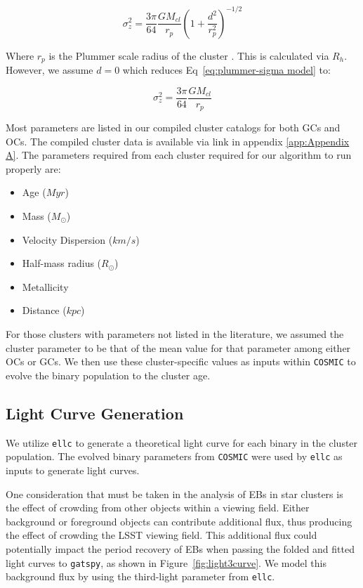\documentclass[twocolumn]{aastex63}
\begin{document}
\begin{equation}
    \sigma_z^2 = \frac{3\pi}{64}\frac{GM_{cl}}{r_p}\left(1 + \frac{d^2}{r_p^2} \right)^{-1/2}
    \label{eq:plummer-sigma model}
\end{equation}

 Where $r_p$ is the Plummer scale radius of the cluster \citep{1911MNRAS..71..460P}. This is calculated via $R_h$. However, we assume $d=0$ which reduces Eq~\ref{eq:plummer-sigma model} to:
 
 \begin{equation}
    \sigma_z^2 = \frac{3\pi}{64}\frac{GM_{cl}}{r_p}
    \label{eq:plummer-sigma mode (simplified)l}
\end{equation}
 
 Most parameters are listed in our compiled cluster catalogs for both GCs and OCs. The compiled cluster data is available via link in appendix \ref{app:Appendix A}. The parameters required from each cluster required for our algorithm to run properly are:
 
\begin{itemize}
    \item Age ($Myr$)
    \item Mass ($M_{\odot}$)
    \item Velocity Dispersion ($km/s$)
    \item Half-mass radius ($R_{\odot}$)
    \item Metallicity
    \item Distance ($kpc$)
\end{itemize}
 For those clusters with parameters  not listed in the literature, we assumed the cluster parameter to be that of the mean value for that parameter among either OCs or GCs. We then use these cluster-specific values as inputs within \texttt{COSMIC} to evolve the binary population to the cluster age.
 
\subsection{Light Curve Generation}
\label{subsec:ellc}
 We utilize \texttt{ellc} \citep{2016ascl.soft03016M} to generate a theoretical light curve for each binary in the cluster population. The evolved binary parameters from \texttt{COSMIC} were used by \texttt{ellc} as inputs to generate light curves.
 
One consideration that must be taken in the analysis of EBs in star clusters is the effect of crowding from other objects within a viewing field. Either background or foreground objects can contribute additional flux, thus producing the effect of crowding the LSST viewing field. This additional flux could potentially impact the period recovery of EBs when passing the folded and fitted light curves to \texttt{gatspy}, as shown in Figure~\ref{fig:light3curve}. We model this background flux by using the third-light parameter from \texttt{ellc}.
 
\end{document}
